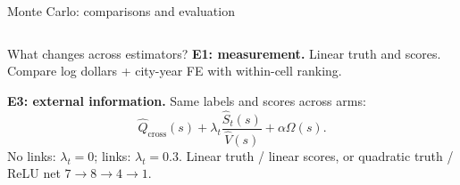 \documentclass[10pt,aspectratio=169]{beamer}
\begin{document}
\begin{frame}{Monte Carlo: comparisons and evaluation}
\begin{columns}[T]
\begin{tbox}[blue]{What changes across estimators?}
\scriptsize
\textbf{E1: measurement.} Linear truth and scores. Compare log dollars + city-year FE with within-cell ranking.

\textbf{E3: external information.} Same labels and scores across arms:
\vspace{-0.4em}
\[
 \widehat Q_{\mathrm{cross}}(s)
 +\lambda_t\frac{\widehat S_t(s)}{\widehat V(s)}
 +\alpha\Omega(s).
\]
\vspace{-0.4em}
No links: $\lambda_t=0$; links: $\lambda_t=0.3$. Linear truth / linear scores, or quadratic truth / ReLU net $7\to8\to4\to1$.


\end{tbox}
\end{columns}
\end{frame}
\end{document}
